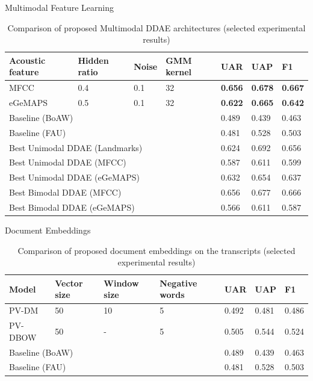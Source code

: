 \documentclass{beamer}
\begin{document}
\begin{frame}{Multimodal Feature Learning}

\begin{table}[htb]
    \small
    \centering
    \caption{Comparison of proposed Multimodal DDAE architectures (selected experimental results)}
    \begin{tabular}{p{1.7cm}|p{1.2cm}|l|p{1.1cm}|l|l|l}
    \hline
    \hline
        Acoustic feature & Hidden ratio & Noise & GMM kernel & UAR & UAP & F1 \\
        \hline
        MFCC  & 0.4 & 0.1 & 32 & \textbf{0.656} & \textbf{0.678} & \textbf{0.667} \\
        \hline
        eGeMAPS & 0.5 & 0.1 & 32 & \textbf{0.622} & \textbf{0.665} & \textbf{0.642} \\
        \hline
        \multicolumn{4}{l|}{Baseline (BoAW)} & 0.489 & 0.439 & 0.463 \\
        \multicolumn{4}{l|}{Baseline (FAU)} & 0.481 & 0.528 & 0.503 \\
        \hline
        \multicolumn{4}{l|}{Best Unimodal DDAE (Landmarks)} & 0.624 & 0.692 & 0.656 \\
        \multicolumn{4}{l|}{Best Unimodal DDAE (MFCC)} & 0.587 & 0.611 & 0.599 \\
        \multicolumn{4}{l|}{Best Unimodal DDAE (eGeMAPS)} & 0.632 & 0.654 & 0.637 \\
        \hline
        \multicolumn{4}{l|}{Best Bimodal DDAE (MFCC)} & 0.656 & 0.677 & 0.666 \\
        \multicolumn{4}{l|}{Best Bimodal DDAE (eGeMAPS)} & 0.566 & 0.611 & 0.587 \\
    \hline
    \hline
    \end{tabular}
    \label{tab:multimodal_res}
\end{table}

\end{frame}



\begin{frame}{Document Embeddings}


\begin{table}[htb]
\centering
\small
\caption{Comparison of proposed document embeddings on the transcripts (selected experimental results)}
    \begin{tabular}{l|p{1.0cm}|p{1.2cm}|p{1.3cm}|l|l|l}
    \hline
    \hline
        Model & Vector size & Window size & Negative words & UAR & UAP & F1 \\
        \hline
        PV-DM & 50 & 10 & 5 & 0.492 & 0.481 & 0.486 \\
        \hline
        PV-DBOW & 50 & - & 5 & 0.505 & 0.544 & 0.524 \\
        \hline
        \multicolumn{4}{l|}{Baseline (BoAW)} & 0.489 & 0.439 & 0.463 \\
        \multicolumn{4}{l|}{Baseline (FAU)} & 0.481 & 0.528 & 0.503 \\
   \hline
   \hline
\end{tabular}
\label{tab:doc2vec_res}
\end{table}
    
\end{frame}
\end{document}
